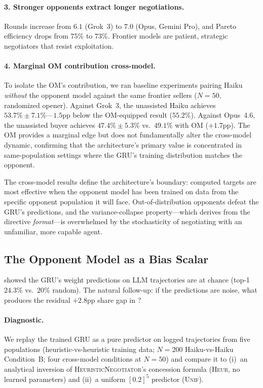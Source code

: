 \documentclass[11pt,a4paper]{article}
\begin{document}
\paragraph{3. Stronger opponents extract longer negotiations.} Rounds increase from $6.1$ (Grok~3) to $7.0$ (Opus, Gemini Pro), and Pareto efficiency drops from $75\%$ to $73\%$. Frontier models are patient, strategic negotiators that resist exploitation.

\paragraph{4. Marginal OM contribution cross-model.} To isolate the OM's contribution, we ran baseline experiments pairing Haiku \emph{without} the opponent model against the same frontier sellers ($N = 50$, randomized opener). Against Grok~3, the unassisted Haiku achieves $53.7\% \pm 7.1\%$---$1.5$pp below the OM-equipped result ($55.2\%$). Against Opus~4.6, the unassisted buyer achieves $47.4\% \pm 5.3\%$ vs.\ $49.1\%$ with OM ($+1.7$pp). The OM provides a marginal edge but does not fundamentally alter the cross-model dynamic, confirming that the architecture's primary value is concentrated in same-population settings where the GRU's training distribution matches the opponent.

The cross-model results define the architecture's boundary: computed targets are most effective when the opponent model has been trained on data from the specific opponent population it will face. Out-of-distribution opponents defeat the GRU's predictions, and the variance-collapse property---which derives from the directive \emph{format}---is overwhelmed by the stochasticity of negotiating with an unfamiliar, more capable agent.

\subsection{The Opponent Model as a Bias Scalar}
\label{sec:bias_scalar}

 showed the GRU's weight predictions on LLM trajectories are at chance (top-1 $24.3\%$ vs.\ $20\%$ random). The natural follow-up: if the predictions are noise, what produces the residual $+2.8$pp share gap in ?

\paragraph{Diagnostic.} We replay the trained GRU as a pure predictor on logged trajectories from five populations (heuristic-vs-heuristic training data; $N\!=\!200$ Haiku-vs-Haiku Condition~B; four cross-model conditions at $N\!=\!50$) and compare it to (i)~an analytical inversion of \textsc{HeuristicNegotiator}'s concession formula (\textsc{Heur}, no learned parameters) and (ii)~a uniform $[0.2]^5$ predictor (\textsc{Unif}).
\end{document}
